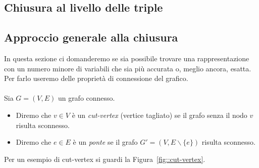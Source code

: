 \subsection{Chiusura al livello delle triple}
\lipsum[6-10]
\subsection{Approccio generale alla chiusura}
In questa sezione ci domanderemo se sia possibile trovare una rappresentazione con un numero minore di variabili che sia pi\`u accurata o,  meglio ancora, esatta.  Per farlo useremo delle propriet\`a di connessione del grafico.\\ \\
Sia $G=(V,E)$ un grafo connesso.
\begin{itemize}
\item Diremo che $v\in V$ \`e un \textit{cut-vertex} (vertice tagliato) se il grafo senza il nodo $v$ risulta sconnesso.
\item Diremo che $e\in E$ \`e un \textit{ponte} se il grafo $G'=(V, E\backslash\{e\})$ risulta sconnesso.
\end{itemize}
Per un esempio di cut-vertex si guardi la Figura~\ref{fig::cut-vertex}.
